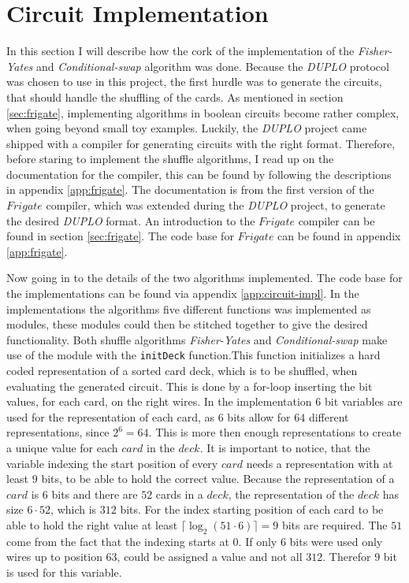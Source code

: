 \documentclass[twoside,11pt,openright]{report}
\newcommand{\FY}{\textit{Fisher-Yates} }
\newcommand{\CS}{\textit{Conditional-swap} }
\newcommand{\DUPLO}{\textit{DUPLO} }
\begin{document}
\section{Circuit Implementation}
\label{sec:cir_imp}
In this section I will describe how the cork of the implementation of the \FY and \CS algorithm was done. Because the \DUPLO protocol was chosen to use in this project, the first hurdle was to generate the circuits, that should handle the shuffling of the cards. As mentioned in section \ref{sec:frigate}, implementing algorithms in boolean circuits become rather complex, when going beyond small toy examples. Luckily, the \DUPLO project came shipped with a compiler for generating circuits with the right format. Therefore, before staring to implement the shuffle algorithms, I read up on the documentation for the compiler, this can be found by following the descriptions in appendix \ref{app:frigate}. The documentation is from the first version of the $Frigate$ compiler, which was extended during the \DUPLO project, to generate the desired \DUPLO format. An introduction to the $Frigate$ compiler can be found in section \ref{sec:frigate}. The code base for $Frigate$ can be found in appendix \ref{app:frigate}.

\bigskip

Now going in to the details of the two algorithms implemented. The code base for the implementations can be found via appendix \ref{app:circuit-impl}. In the implementations the algorithms five different functions was implemented as modules, these modules could then be stitched together to give the desired functionality. Both shuffle algorithms \FY and \CS make use of the module with the \verb|initDeck| function.This function initializes a hard coded representation of a sorted card deck, which is to be shuffled, when evaluating the generated circuit. This is done by a for-loop inserting the bit values, for each card, on the right wires. In the implementation $6$ bit variables are used for the representation of each card, as $6$ bits allow for $64$ different representations, since $2^6=64$. This is more then enough representations to create a unique value for each $card$ in the $deck$. It is important to notice, that the variable indexing the start position of every $card$ needs a representation with at least $9$ bits, to be able to hold the correct value. Because the representation of a $card$ is $6$ bits and there are $52$ cards in a $deck$, the representation of the $deck$ has size $6\cdot52$, which is $312$ bits. For the index starting position of each card to be able to hold the right value at least $\lceil \log_2(51\cdot 6)\rceil=9$ bits are required. The $51$ come from the fact that the indexing starts at $0$. If only $6$ bits were used only wires up to position $63$, could be assigned a value and not all $312$. Therefor $9$ bit is used for this variable.
\end{document}
